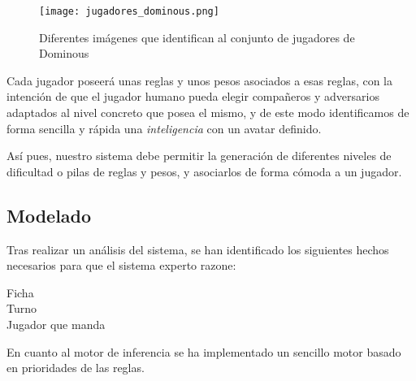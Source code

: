 \begin{figure}[h]
  \label{fig:jugadores_dominous}
  \begin{center}
    \texttt{[image: jugadores\_dominous.png]}
  \end{center}
  \caption{Diferentes imágenes que identifican al conjunto de jugadores de Dominous}
\end{figure}

Cada jugador poseerá unas reglas y unos pesos asociados a esas reglas, con la intención de que el jugador humano pueda
elegir compañeros y adversarios adaptados al nivel concreto que posea el mismo, y de este modo identificamos de forma
sencilla y rápida una \emph{inteligencia} con un avatar definido.

Así pues, nuestro sistema debe permitir la generación de diferentes niveles de dificultad o pilas de reglas y pesos,
y asociarlos de forma cómoda a un jugador.

\subsection{Modelado}

Tras realizar un análisis del sistema, se han identificado los siguientes hechos necesarios para que el sistema experto razone:

\begin{description}
    \item[Ficha]
    \item[Turno]
    \item[Jugador que manda]
\end{description}

En cuanto al motor de inferencia se ha implementado un sencillo motor basado en prioridades de las reglas.


